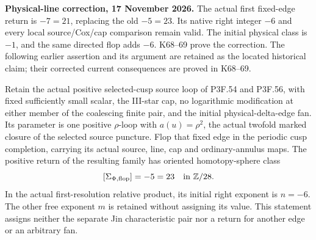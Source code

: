 \begin{theorem}\label{night:P3K.40}
\par\noindent\textbf{Physical-line correction, 17 November 2026.} The actual first fixed-edge return is \(-7=21\), replacing the old \(-5=23\). Its native right integer \(-6\) and every local source/Cox/cap comparison remain valid. The initial physical class is \(-1\), and the same directed flop adds \(-6\). K68--69 prove the correction. The following earlier assertion and its argument are retained as the located historical claim; their corrected current consequences are proved in K68--69.\medskip\par 
Retain the actual positive selected-cusp source loop of P3F.54 and
P3F.56, with fixed sufficiently small scalar, the III-star cap, no
logarithmic modification at either member of the coalescing finite
pair, and the initial physical-delta-edge fan. Its parameter is one
positive \(\rho\)-loop with \(a(u)=\rho^2\), the actual twofold
marked closure of the selected source puncture. Flop that fixed edge
in the periodic cusp completion, carrying its actual source, line,
cap and ordinary-annulus maps. The positive return of the resulting
family has oriented homotopy-sphere class
\[
                 [\Sigma_{\Phi,\mathrm{flop}}]
                     =-5=23\quad\hbox{in }\mathbb Z/28.
\]
In the actual first-resolution relative product, its initial right
exponent is \(n=-6\). The other free exponent \(m\) is retained
without assigning its value. This statement assigns neither the
separate Jin characteristic pair nor a return for another edge or
an arbitrary fan.
\end{theorem}
